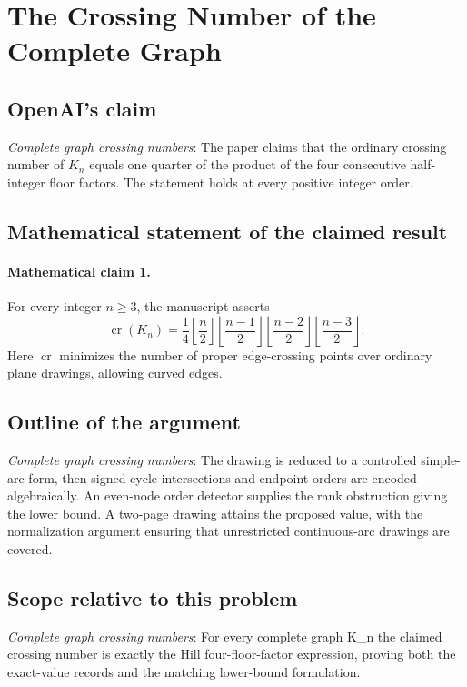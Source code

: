 \documentclass[11pt]{article}
\begin{document}
\section*{The Crossing Number of the Complete Graph}

\subsection{OpenAI's claim}
\textit{Complete graph crossing numbers}: The paper claims that the ordinary crossing number of $K_n$ equals one quarter of the product of the four consecutive half-integer floor factors. The statement holds at every positive integer order.

\subsection{Mathematical statement of the claimed result}
\paragraph{Mathematical claim 1.} For every integer $n\ge3$, the manuscript asserts \[\operatorname{cr}(K_n)=\frac14\left\lfloor\frac n2\right\rfloor\left\lfloor\frac{n-1}2\right\rfloor\left\lfloor\frac{n-2}2\right\rfloor\left\lfloor\frac{n-3}2\right\rfloor.\] Here $\operatorname{cr}$ minimizes the number of proper edge-crossing points over ordinary plane drawings, allowing curved edges.

\subsection{Outline of the argument}
\textit{Complete graph crossing numbers}: The drawing is reduced to a controlled simple-arc form, then signed cycle intersections and endpoint orders are encoded algebraically. An even-node order detector supplies the rank obstruction giving the lower bound. A two-page drawing attains the proposed value, with the normalization argument ensuring that unrestricted continuous-arc drawings are covered.

\subsection{Scope relative to this problem}
\textit{Complete graph crossing numbers}: For every complete graph K\_n the claimed crossing number is exactly the Hill four-floor-factor expression, proving both the exact-value records and the matching lower-bound formulation.
\end{document}
